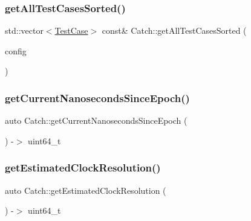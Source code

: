 \mbox{\label{namespace_catch_a1c9b1a23bc947ea70ddaabf067276cf2}} 
\subsubsection{\texorpdfstring{get\+All\+Test\+Cases\+Sorted()}{getAllTestCasesSorted()}}
{\footnotesize\ttfamily std\+::vector$<$\mbox{\hyperlink{class_catch_1_1_test_case}{Test\+Case}}$>$ const\& Catch\+::get\+All\+Test\+Cases\+Sorted (\begin{DoxyParamCaption}\item[{I\+Config const \&}]{config }\end{DoxyParamCaption})}

\mbox{\label{namespace_catch_a98d058468488c486a9cb5c8463f3ba29}} 
\subsubsection{\texorpdfstring{get\+Current\+Nanoseconds\+Since\+Epoch()}{getCurrentNanosecondsSinceEpoch()}}
{\footnotesize\ttfamily auto Catch\+::get\+Current\+Nanoseconds\+Since\+Epoch (\begin{DoxyParamCaption}{ }\end{DoxyParamCaption}) -\/$>$  uint64\+\_\+t}

\mbox{\label{namespace_catch_ac8e1ed37624bd0d97b2c0d4ec099d31f}} 
\subsubsection{\texorpdfstring{get\+Estimated\+Clock\+Resolution()}{getEstimatedClockResolution()}}
{\footnotesize\ttfamily auto Catch\+::get\+Estimated\+Clock\+Resolution (\begin{DoxyParamCaption}{ }\end{DoxyParamCaption}) -\/$>$  uint64\+\_\+t}


